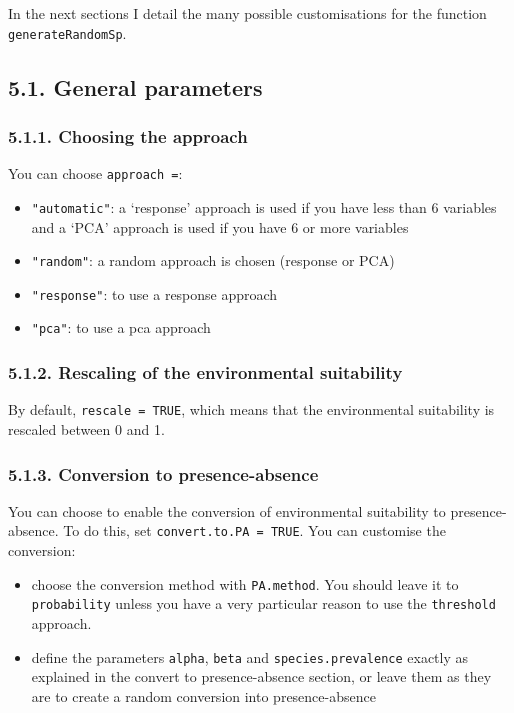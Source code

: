 \documentclass[]{article}
\providecommand{\tightlist}{%
  \setlength{\itemsep}{0pt}\setlength{\parskip}{0pt}}
\begin{document}
In the next sections I detail the many possible customisations for the
function \texttt{generateRandomSp}.

\subsection{5.1. General parameters}\label{general-parameters}

\subsubsection{5.1.1. Choosing the
approach}\label{choosing-the-approach}

You can choose \texttt{approach\ =}:

\begin{itemize}
\tightlist
\item
  \texttt{"automatic"}: a `response' approach is used if you have less
  than 6 variables and a `PCA' approach is used if you have 6 or more
  variables
\item
  \texttt{"random"}: a random approach is chosen (response or PCA)
\item
  \texttt{"response"}: to use a response approach
\item
  \texttt{"pca"}: to use a pca approach
\end{itemize}

\subsubsection{5.1.2. Rescaling of the environmental
suitability}\label{rescaling-of-the-environmental-suitability}

By default, \texttt{rescale\ =\ TRUE}, which means that the
environmental suitability is rescaled between 0 and 1.

\subsubsection{5.1.3. Conversion to
presence-absence}\label{conversion-to-presence-absence}

You can choose to enable the conversion of environmental suitability to
presence-absence. To do this, set \texttt{convert.to.PA\ =\ TRUE}. You
can customise the conversion:

\begin{itemize}
\tightlist
\item
  choose the conversion method with \texttt{PA.method}. You should leave
  it to \texttt{probability} unless you have a very particular reason to
  use the \texttt{threshold} approach.
\item
  define the parameters \texttt{alpha}, \texttt{beta} and
  \texttt{species.prevalence} exactly as explained in the convert to
  presence-absence section, or leave them as they are to create a random
  conversion into presence-absence
\end{itemize}
\end{document}
